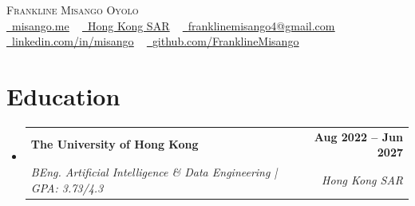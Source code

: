 \documentclass[letterpaper,10.5pt]{article}
\makeatletter
\newcommand{\resumeSubheading}[4]{
  \vspace{-2pt}\item
    \begin{tabular*}{1.0\textwidth}[t]{l@{\extracolsep{\fill}}r}
      \textbf{#1} & \textbf{\small #2} \\
      \textit{\small#3} & \textit{\small #4} \\
    \end{tabular*}\vspace{-7pt}
}
\newcommand{\resumeSubHeadingListStart}{\begin{itemize}[leftmargin=0.0in, label={}]}
\newcommand{\resumeSubHeadingListEnd}{\end{itemize}}
\newcommand{\resumeItemListStart}{\begin{itemize}}
\newcommand{\resumeItemListEnd}{\end{itemize}\vspace{-5pt}}
\makeatother
\begin{document}
\begin{center}
    {\Huge \scshape Frankline Misango Oyolo} \\ \vspace{1pt}
    \small \href{https://misango.me}{\raisebox{-0.2\height}\faGlobe\ \underline{misango.me}} ~
    \small \href{}{\raisebox{-0.2\height}\faLocation\ \underline{Hong Kong SAR}} ~
    \href{mailto:franklinemisango4@gmail.com}{\raisebox{-0.2\height}\faEnvelope\ \underline{franklinemisango4@gmail.com}} ~ 
    \href{https://linkedin.com/in/misango}{\raisebox{-0.2\height}\faLinkedin\ \underline{linkedin.com/in/misango}} ~
    \href{https://github.com/FranklineMisango}{\raisebox{-0.2\height}\faGithub\ \underline{github.com/FranklineMisango}}
    \vspace{-8pt}
\end{center}

\section{Education}
\resumeSubHeadingListStart
\resumeSubheading
{The University of Hong Kong}{Aug 2022 -- Jun 2027}
{BEng. Artificial Intelligence \& Data Engineering | GPA: 3.73/4.3}{Hong Kong SAR}
\resumeItemListStart
\resumeItemListEnd
\resumeSubHeadingListEnd
\vspace{-13pt}

\end{document}
